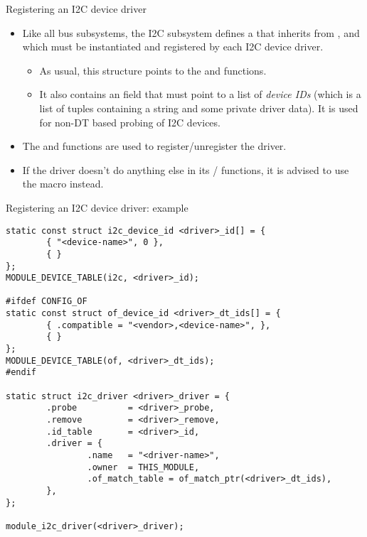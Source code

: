\begin{frame}{Registering an I2C device driver}
  \begin{itemize}
  \item Like all bus subsystems, the I2C subsystem defines a
     that inherits from
    , and which must be instantiated and
    registered by each I2C device driver.
    \begin{itemize}
    \item As usual, this structure points to the  and
       functions.
    \item It also contains an  field that must point to a
      list of {\em device IDs} (which is a list of tuples containing a
      string and some private driver data). It is used for non-DT based
      probing of I2C devices.
    \end{itemize}
  \item The  and  functions
    are used to register/unregister the driver.
  \item If the driver doesn't do anything else in its
    / functions, it is advised to use
    the  macro instead.
  \end{itemize}
\end{frame}

\begin{frame}[fragile]{Registering an I2C device driver: example}
  \begin{block}{}
  \begin{verbatim}
static const struct i2c_device_id <driver>_id[] = {
        { "<device-name>", 0 },
        { }
};
MODULE_DEVICE_TABLE(i2c, <driver>_id);

#ifdef CONFIG_OF
static const struct of_device_id <driver>_dt_ids[] = {
        { .compatible = "<vendor>,<device-name>", },
        { }
};
MODULE_DEVICE_TABLE(of, <driver>_dt_ids);
#endif

static struct i2c_driver <driver>_driver = {
        .probe          = <driver>_probe,
        .remove         = <driver>_remove,
        .id_table       = <driver>_id,
        .driver = {
                .name   = "<driver-name>",
                .owner  = THIS_MODULE,
                .of_match_table = of_match_ptr(<driver>_dt_ids),
        },
};

module_i2c_driver(<driver>_driver);
\end{verbatim}
\end{block}
\end{frame}

